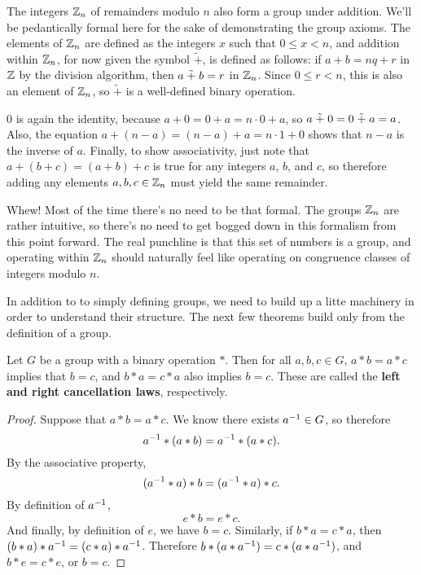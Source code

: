 \begin{example}
The integers $\zn[n]$ of remainders modulo $n$ also form a group under addition. We'll be pedantically formal here for the sake of demonstrating the group axioms. The elements of $\zn[n]$ are defined as the integers $x$ such that $0 \leq x < n$, and addition within $\zn[n]$, for now given the symbol $\tilde +$, is defined as follows: if $a + b = nq + r$ in $\z$ by the division algorithm, then $a \np b = r$ in $\zn[n]$. Since $0 \leq r < n$, this is also an element of $\zn[n]$, so $\tilde{+}$ is a well-defined binary operation.

$0$ is again the identity, because $a + 0 = 0 + a = n\cdot 0 + a$, so $a \np 0 = 0 \np a = a$. Also, the equation $a + (n-a) = (n-a) + a = n\cdot 1 + 0$ shows that $n-a$ is the inverse of $a$. Finally, to show associativity, just note that $a + (b + c) = (a + b) + c$ is true for any integers $a$, $b$, and $c$, so therefore adding any elements $a, b, c \in \zn[n]$ must yield the same remainder.
\end{example}

Whew! Most of the time there's no need to be that formal. The groups $\zn[n]$ are rather intuitive, so there's no need to get bogged down in this formalism from this point forward. The real punchline is that this set of numbers is a group, and operating within $\zn[n]$ should naturally feel like operating on congruence classes of integers modulo $n$.

In addition to to simply defining groups, we need to build up a litte machinery in order to understand their structure. The next few theorems build only from the definition of a group.

\begin{theorem}
Let $G$ be a group with a binary operation $*$. Then for all $a, b, c \in G$, $a * b = a * c$ implies that $b = c$, and $b*a = c*a$ also implies $b=c$. These are called the \textbf{left and right cancellation laws}, respectively.
\end{theorem}

\begin{proof}
Suppose that $a*b = a*c$. We know there exists $\inv{a} \in G$, so therefore
\begin{equation*}
    \inv{a} * (a*b) = \inv{a} * (a*c).
\end{equation*}
By the associative property,
\begin{equation*}
    (\inv{a} * a) * b = (\inv{a} * a) * c.
\end{equation*}
By definition of $\inv{a}$,
\begin{equation*}
    e * b = e * c.
\end{equation*}
And finally, by definition of $e$, we have $b = c$. Similarly, if $b*a = c*a$, then $(b*a)*\inv{a} = (c*a)*\inv{a}$. Therefore $b*(a*\inv{a}) = c*(a*\inv{a})$, and $b*e = c*e$, or $b = c$.

\end{proof}

